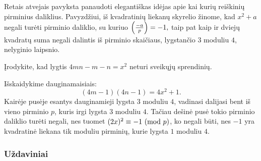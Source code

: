 Retais atvejais pavyksta panaudoti elegantiškas idėjas apie kai kurių
reiškinių pirminius daliklius. Pavyzdžiui, iš kvadratinių liekanų skyrelio
žinome, kad $x^2 + a$ negali turėti pirminio daliklio, su kuriuo
$\left(\frac{-a}{p}\right) = -1,$ taip pat kaip ir dviejų kvadratų suma negali dalintis iš
pirminio skaičiaus, lygstančio $3$ moduliu $4$, nelyginio laipsnio.

\begin{pav} 
  Įrodykite, kad lygtis $4mn - m - n = x^2$ neturi sveikųjų sprendinių.
\end{pav}

\begin{sprendimas}
  Išskaidykime dauginamaisiais: $$(4m-1)(4n-1) = 4x^2 + 1.$$ Kairėje pusėje
  esantys dauginamieji lygsta $3$ moduliu $4$, vadinasi dalijasi bent iš
  vieno pirminio $p$, kuris irgi lygsta $3$ moduliu $4$. Tačiau dešinė
  pusė tokio pirminio daliklio turėti negali, nes tuomet $(2x)^2 \equiv -1
  \ (\text{mod } p)$, ko negali būti, nes $-1$ yra kvadratinė liekana tik moduliu
  pirminių, kurie lygsta $1$ moduliu $4$.
\end{sprendimas}

\subsubsection{Uždaviniai}

